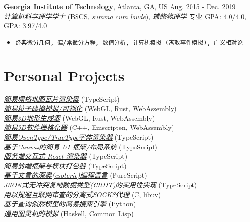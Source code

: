 \documentclass[12pt]{article}
\begin{document}
\textbf{Georgia Institute of Technology}, Atlanta, GA, US \hfill Aug. 2015 - Dec. 2019\\
\textit{计算机科学理学学士} (BSCS, \textit{summa cum laude}), \textit{辅修物理学} \hfill 专业 GPA: 4.0/4.0, GPA: 3.97/4.0
\begin{itemize}
\item \texttt{经典微分几何, 偏/常微分方程, 数值分析, 计算机模拟 (离散事件模拟), 广义相对论}
\end{itemize}

\section*{Personal Projects}
\href{https://galmungral.github.io/mercator}{\textit{简易栅格地图瓦片渲染器}} \hfill (TypeScript) \\
\href{https://galmungral.github.io/particle-simulation}{\textit{简易粒子碰撞模拟/可视化}} 
\hfill (WebGL, Rust, WebAssembly) \\
\href{https://galmungral.github.io/terrain-generator}{\textit{简易3D地形生成器}} \hfill (WebGL, Rust, WebAssembly) \\
\href{https://galmungral.github.io/rasterizer?file=billboard.txt}{\textit{简易3D软件栅格化器}} \hfill (C++, Emscripten, WebAssembly) \\
\href{https://galmungral.github.io/text2svg}{\textit{简易OpenType/TrueType字体渲染器}} \hfill (TypeScript) \\
\href{https://galmungral.github.io/michelangelo}{\textit{基于Canvas的简易 UI 框架/布局系统}} \hfill (TypeScript) \\
\href{https://github.com/galmungral/react-teletype}{\textit{服务端交互式 React 渲染器}} \hfill (TypeScript) \\
\href{https://github.com/galmungral/replay}{\textit{简易前端框架与模块打包器}} \hfill (TypeScript) \\
\href{https://galmungral.github.io/hanbun-lang}{\textit{基于文言的深奥(esoteric)编程语言}} \hfill (PureScript) \\
\href{https://github.com/galmungral/json-crdt}{\textit{JSON式无冲突复制数据类型(CRDT)的实用性实现}} \hfill (TypeScript) \\
\href{https://github.com/galmungral/telescope}{\textit{用以规避互联网审查的分离式SOCKS代理}} \hfill (C, libuv) \\
\href{https://github.com/galmungral/plato}{\textit{基于查询似然模型的简易搜索引擎}} \hfill (Python) \\
\href{https://github.com/galmungral/turing-machine}{\textit{通用图灵机的模拟}} \hfill (Haskell, Common Lisp)
\end{document}
